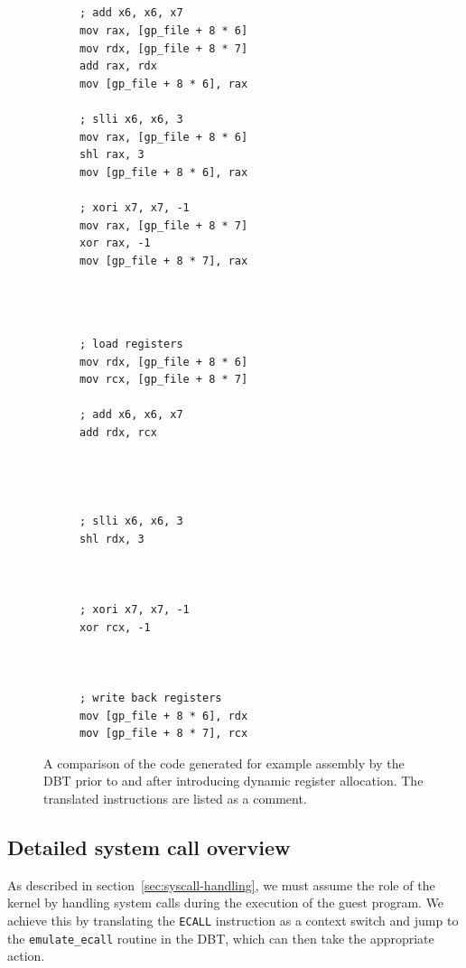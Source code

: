 \begin{figure}[h]
\begin{subfigure}{0.45\textwidth}
\begin{lstlisting}[label={lst:without-lazy-replace}, showlines=true]




; add x6, x6, x7
mov	rax, [gp_file + 8 * 6]
mov	rdx, [gp_file + 8 * 7]
add	rax, rdx
mov	[gp_file + 8 * 6], rax

; slli x6, x6, 3
mov	rax, [gp_file + 8 * 6]
shl	rax, 3
mov	[gp_file + 8 * 6], rax

; xori x7, x7, -1
mov	rax, [gp_file + 8 * 7]
xor	rax, -1
mov	[gp_file + 8 * 7], rax




\end{lstlisting}
\end{subfigure}
\hfill
\begin{subfigure}{0.45\textwidth}
\begin{lstlisting}[label={lst:with-lazy-replace}, showlines=true]
; load registers
mov rdx, [gp_file + 8 * 6]
mov rcx, [gp_file + 8 * 7]

; add x6, x6, x7
add	rdx, rcx




; slli x6, x6, 3
shl	rdx, 3



; xori x7, x7, -1
xor	rcx, -1



; write back registers
mov [gp_file + 8 * 6], rdx
mov [gp_file + 8 * 7], rcx
\end{lstlisting}
\end{subfigure}
\label{fig:lazy-replace-code}
\caption[Example assembly for dynamic register allocation]%
{A comparison of the code generated for example assembly by the DBT prior to and after introducing dynamic register allocation. The translated instructions are listed as a comment.}
\end{figure}



\subsection{Detailed system call overview}
As described in section~\vref{sec:syscall-handling}, we must assume the role of the kernel by handling system calls during the execution of the guest program.
We achieve this by translating the \texttt{ECALL} instruction as a context switch and jump to the \texttt{emulate\_ecall} routine in the DBT, which can then take the appropriate action.

